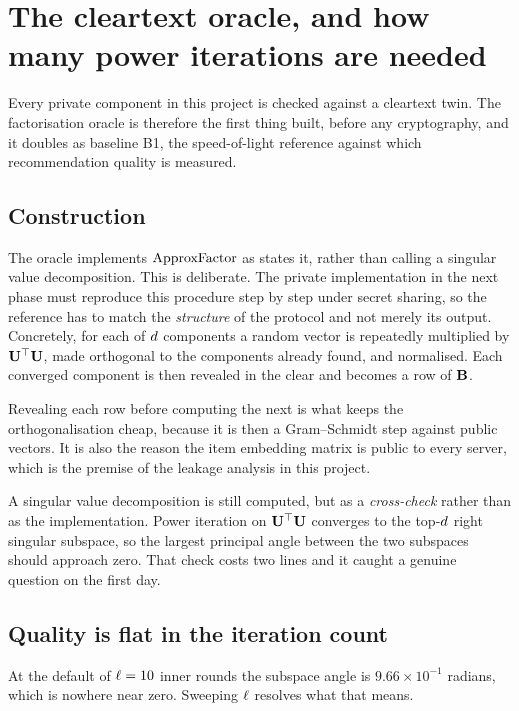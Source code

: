 \section{The cleartext oracle, and how many power iterations are needed}
\label{sec:tech:oracle}

Every private component in this project is checked against a cleartext twin.
The factorisation oracle is therefore the first thing built, before any
cryptography, and it doubles as baseline B1, the speed-of-light reference
against which recommendation quality is measured.

\subsection{Construction}
\label{sec:tech:oracle:construction}

The oracle implements $\operatorname{ApproxFactor}$ as \nudgeplain{} states it, rather than
calling a singular value decomposition. This is deliberate. The private
implementation in the next phase must reproduce this procedure step by step
under secret sharing, so the reference has to match the \emph{structure} of
the protocol and not merely its output. Concretely, for each of $d$
components a random vector is repeatedly multiplied by
$\mathbf{U}^{\top}\mathbf{U}$, made orthogonal to the components already found,
and normalised. Each converged component is then revealed in the clear and
becomes a row of $\mathbf{B}$.

Revealing each row before computing the next is what keeps the
orthogonalisation cheap, because it is then a Gram--Schmidt step against
public vectors. It is also the reason the item embedding matrix is public to
every server, which is the premise of the leakage analysis in this project.

A singular value decomposition is still computed, but as a \emph{cross-check}
rather than as the implementation. Power iteration on
$\mathbf{U}^{\top}\mathbf{U}$ converges to the top-$d$ right singular
subspace, so the largest principal angle between the two subspaces should
approach zero. That check costs two lines and it caught a genuine question on
the first day.

\subsection{Quality is flat in the iteration count}
\label{sec:tech:oracle:ell}

At the default of $\ell = 10$ inner rounds the subspace angle is
$9.66 \times 10^{-1}$ radians, which is nowhere near zero. Sweeping $\ell$
resolves what that means.

